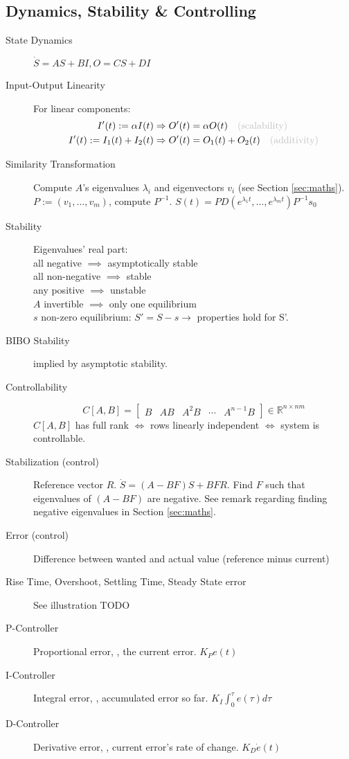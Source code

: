 \subsection{Dynamics, Stability \& Controlling}
\begin{description}
	\item[State Dynamics] $\dot{S} = AS + BI, O = CS + DI$
	\item[Input-Output Linearity] For linear components: \\
	\begin{align*}
	I'(t) := \alpha I(t) &\Rightarrow O'(t) = \alpha O(t) \NOTE{(scalability)}\\
	I'(t) := I_1(t) + I_2(t) &\Rightarrow O'(t) = O_1(t) + O_2(t) \NOTE{(additivity)}
	\end{align*}
	\item[Similarity Transformation] Compute $A$'s eigenvalues $\lambda_i$ and
	eigenvectors $v_i$ (see Section \ref{sec:maths}).\nl
	$P := (v_1,\ldots, v_m)$, compute $P^{-1}$. \nl
	$S(t) = PD(e^{\lambda_1t}, \ldots, e^{\lambda_mt})P^{-1} s_0$
	\item[Stability] Eigenvalues' real part:\\
    all negative $\implies$ asymptotically stable\\ 
	all non-negative $\implies$ stable\\
    any positive $\implies$ unstable\\
	$A$ invertible $\implies$ only one equilibrium\\
	$s$ non-zero equilibrium: $S' = S - s \rightarrow$ properties hold for S'. 
	\item[BIBO Stability] implied by asymptotic stability.
	\item[Controllability] \[C[A,B] = \left[ \begin{array}{ccccc}
    B & AB & A^{2}B & \cdots & A^{n-1}B \end{array} \right] \in \mathbb{R}^{n \times nm}\]
    $C[A,B]$ has full rank $\iff$ rows linearly independent $\iff$ system is controllable.
	\item[Stabilization (control)] Reference vector $R$. $\dot{S} = (A - BF)S + BFR$. Find
	$F$ such that eigenvalues of $(A - BF)$ are negative. See remark regarding
	finding negative eigenvalues in Section \ref{sec:maths}.
	\item[Error (control)] Difference between wanted and actual value (reference minus current)
	\item[Rise Time, Overshoot, Settling Time, Steady State error] See illustration
	TODO
	\item[P-Controller] Proportional error, \ie, the current error. $K_P e(t)$
	\item[I-Controller] Integral error, \ie, accumulated error so far. $K_I
	\int_0^\tau e(\tau) d\tau$
	\item[D-Controller] Derivative error, \ie, current error's rate of change.
	$K_D \dot{e}(t)$
\end{description}
